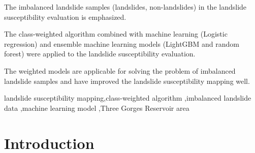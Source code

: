 \documentclass[a4paper,fleqn]{cas-sc}
\begin{document}
 
\begin{highlights}
\item The imbalanced landslide samples (landslides, non-landslides) in the landslide susceptibility evaluation is emphasized.
\item The class-weighted algorithm combined with machine learning (Logistic regression) and ensemble machine learning models (LightGBM and random forest) were applied to the landslide susceptibility evaluation.
\item The weighted models are applicable for solving the problem of imbalanced landslide samples and have improved the landslide susceptibility mapping well.
\end{highlights}

\begin{keywords}
landslide susceptibility mapping\sep class-weighted algorithm \sep imbalanced landslide data \sep machine learning model \sep Three Gorges Reservoir area
\end{keywords}

\maketitle 

\printcredits

\doublespacing


\section{Introduction}
\end{document}

